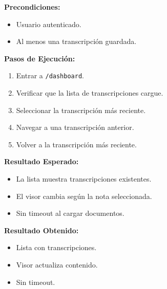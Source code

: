 \documentclass[12pt, a4paper]{article}
\newcommand{\prioChip}[2]{%
  \colorbox{#1}{\textcolor{white}{\footnotesize\textbf{#2}}}%
}
\newcommand{\statusChip}[2]{%
  \colorbox{#1}{\textcolor{white}{\footnotesize\textbf{#2}}}%
}
\begin{document}
\vspace{0.3cm}

\begin{tcolorbox}[enhanced, breakable, colback=white, colframe=espe-blue,
  boxrule=1pt, arc=5pt,
  title={\textbf{CP-06} \enspace Consultar transcripciones guardadas \hfill \prioChip{alta}{Alta} \enspace \statusChip{paso-green}{PASO}},
  fonttitle=\color{white},
  attach boxed title to top left={yshift=-2mm,xshift=4mm},
  boxed title style={colback=espe-blue,arc=3pt}]
\begin{minipage}[t]{0.48\linewidth}
\textbf{Precondiciones:}
\begin{itemize}[noitemsep,topsep=2pt]
  \item Usuario autenticado.
  \item Al menos una transcripci\'on guardada.
\end{itemize}
\textbf{Pasos de Ejecuci\'on:}
\begin{enumerate}[noitemsep,topsep=2pt]
  \item Entrar a \texttt{/dashboard}.
  \item Verificar que la lista de transcripciones cargue.
  \item Seleccionar la transcripci\'on m\'as reciente.
  \item Navegar a una transcripci\'on anterior.
  \item Volver a la transcripci\'on m\'as reciente.
\end{enumerate}
\end{minipage}\hfill
\begin{minipage}[t]{0.48\linewidth}
\textbf{Resultado Esperado:}
\begin{itemize}[noitemsep,topsep=2pt]
  \item La lista muestra transcripciones existentes.
  \item El visor cambia seg\'un la nota seleccionada.
  \item Sin timeout al cargar documentos.
\end{itemize}
\vspace{4pt}
\textbf{Resultado Obtenido:}
\begin{itemize}[noitemsep,topsep=2pt]
  \item[$\checkmark$] Lista con transcripciones.
  \item[$\checkmark$] Visor actualiza contenido.
  \item[$\checkmark$] Sin timeout.
\end{itemize}
\end{minipage}
\end{tcolorbox}
\end{document}
